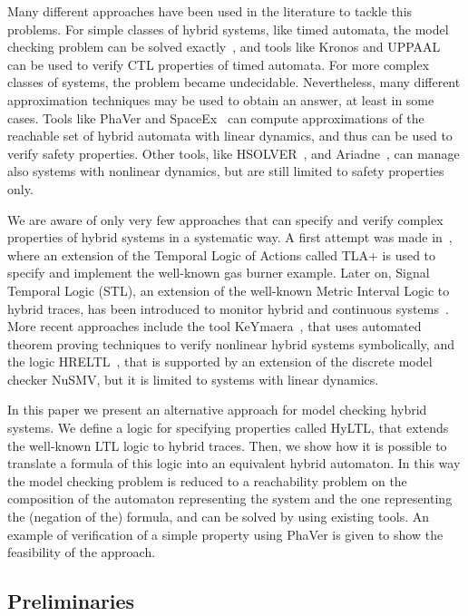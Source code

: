 \documentclass[submission,copyright,creativecommons]{eptcs}
\newcommand{\hyltl}{\textsf{HyLTL}\xspace}
\newcommand{\ltl}{\textsf{LTL}\xspace}
\begin{document}
Many different approaches have been used in the literature to tackle this problems.
For simple classes of hybrid systems, like timed automata, the model checking problem can be solved exactly~\cite{timed_automata}, and tools like Kronos \cite{kronos97} and \textsc{UPPAAL}~\cite{uppaal} can be used to verify CTL properties of timed automata. For more complex classes of systems, the problem became undecidable. Nevertheless, many different approximation techniques may be used to obtain an answer, at least in some cases.
Tools like PhaVer \cite{Frehse2008} and SpaceEx~\cite{Frehse2011}  can compute approximations of the reachable set of hybrid automata with linear dynamics, and thus can be used to verify safety properties.
Other tools, like HSOLVER~\cite{hsolver}, and Ariadne~\cite{ijrnc2012}, can manage also systems with nonlinear dynamics, but are still limited to safety properties only.

We are aware of only very few approaches that can specify and verify complex properties of hybrid systems in a systematic way. A first attempt was made in~\cite{Lamport93}, where an extension of the Temporal Logic of Actions called TLA+ is used to specify and implement the well-known gas burner example. Later on, Signal Temporal Logic (STL), an extension of the well-known Metric Interval Logic to hybrid traces, has been introduced to monitor hybrid and continuous systems~\cite{Maler2004}. More recent approaches include the tool KeYmaera~\cite{Platzer2008}, that uses automated theorem proving techniques to verify nonlinear hybrid systems symbolically, and the logic HRELTL~\cite{Cimatti09}, that is supported by an extension of the discrete model checker NuSMV, but it is limited to systems with linear dynamics. 

In this paper we present an alternative approach for model checking hybrid systems. We define a logic for specifying  properties called \hyltl, that extends the well-known \ltl logic to hybrid traces. Then, we show how it is possible to translate a formula of this logic into an equivalent hybrid automaton. In this way the model checking problem is reduced to a reachability problem on the composition of the automaton representing the system and the one representing the (negation of the) formula, and can be solved by using existing tools. An example of verification of a simple property using PhaVer is given to show the feasibility of the approach.


\subsection{Preliminaries}
\end{document}
